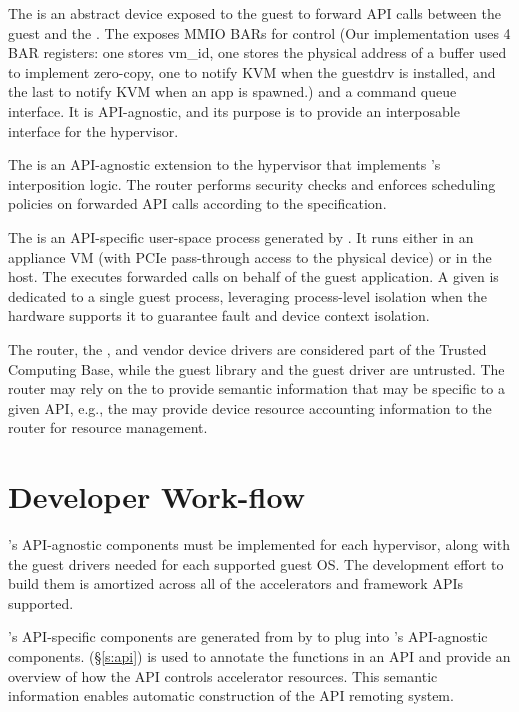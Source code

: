 The \parname{\vdev} is an abstract device exposed to the guest to
forward API calls between the guest and the \worker. The \vdev exposes MMIO
BARs for control (Our implementation uses 4 BAR registers: one stores vm\_id,
one stores the physical address of a buffer used to implement zero-copy, one
to notify KVM when the guestdrv is installed, and the last to notify KVM when
an app is spawned.) and a command queue interface. It is API-agnostic, and its
purpose is to provide an interposable interface for the hypervisor.

The  is an API-agnostic extension to the hypervisor
that implements \AvA's interposition logic. The router performs security
checks and enforces scheduling policies on forwarded API calls according
to the \Lapis specification.

The \parname{\worker} is an API-specific user-space process
generated by \CAvA. It runs either in an appliance VM (with PCIe pass-through
access to the physical device) or in the host. The \worker executes forwarded
calls on behalf of the guest application. A given \Worker is dedicated to a
single guest process, leveraging process-level isolation when the hardware
supports it to guarantee fault and device context isolation.

The router, the \worker, and vendor device drivers are considered part of the
Trusted Computing Base, while the guest library and the guest \vdev driver are
untrusted. The router may rely on the \worker to provide semantic information
that may be specific to a given API, e.g., the \worker may provide device
resource accounting information to the router for resource management.

\section{Developer Work-flow}
\label{sub:workflow}

\AvA's API-agnostic components must be implemented for each hypervisor, along
with the guest drivers needed for each supported guest OS. The development
effort to build them is amortized across all of the accelerators and framework
APIs supported.

\AvA's API-specific components are generated from \Lapis by \CAvA to
plug into \AvA's API-agnostic components. \Lapis (\S\ref{s:api}) is used to
annotate the functions in an API and provide an overview of how the API
controls accelerator resources. This semantic information enables automatic
construction of the API remoting system.

